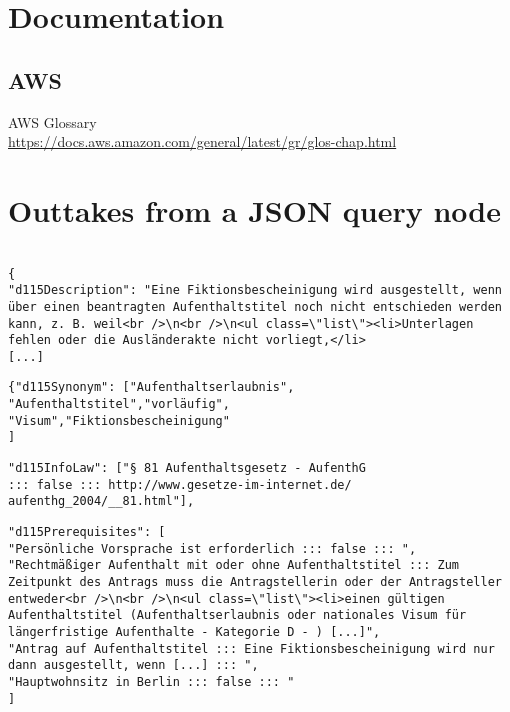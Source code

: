 \section*{Documentation}

\subsection*{AWS}
AWS Glossary\\ 
\url{https://docs.aws.amazon.com/general/latest/gr/glos-chap.html}






\clearpage

\section*{Outtakes from a JSON query node}
\label{query:dl}

\begin{verbatim}

{
"d115Description": "Eine Fiktionsbescheinigung wird ausgestellt, wenn über einen beantragten Aufenthaltstitel noch nicht entschieden werden kann, z. B. weil<br />\n<br />\n<ul class=\"list\"><li>Unterlagen fehlen oder die Ausländerakte nicht vorliegt,</li>
[...]
\end{verbatim}

\begin{verbatim}
{"d115Synonym": ["Aufenthaltserlaubnis",
"Aufenthaltstitel","vorläufig", 
"Visum","Fiktionsbescheinigung"
]
\end{verbatim}

\begin{verbatim}
"d115InfoLaw": ["§ 81 Aufenthaltsgesetz - AufenthG 
::: false ::: http://www.gesetze-im-internet.de/
aufenthg_2004/__81.html"],
\end{verbatim}

\begin{verbatim}
"d115Prerequisites": [
"Persönliche Vorsprache ist erforderlich ::: false ::: ",
"Rechtmäßiger Aufenthalt mit oder ohne Aufenthaltstitel ::: Zum Zeitpunkt des Antrags muss die Antragstellerin oder der Antragsteller entweder<br />\n<br />\n<ul class=\"list\"><li>einen gültigen Aufenthaltstitel (Aufenthaltserlaubnis oder nationales Visum für längerfristige Aufenthalte - Kategorie D - ) [...]",
"Antrag auf Aufenthaltstitel ::: Eine Fiktionsbescheinigung wird nur dann ausgestellt, wenn [...] ::: ",
"Hauptwohnsitz in Berlin ::: false ::: "
]
\end{verbatim}

